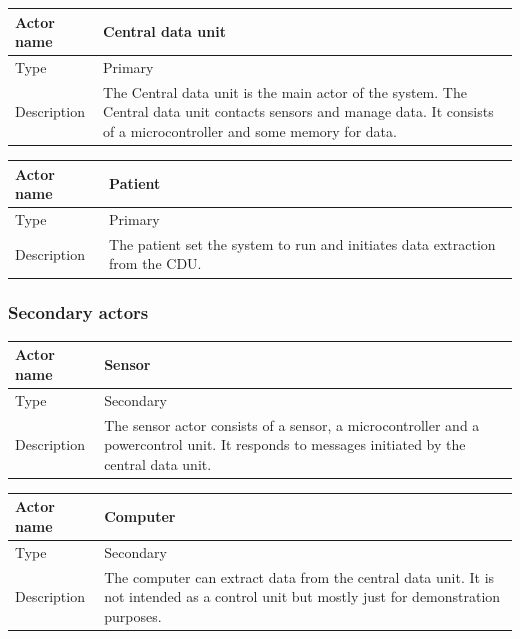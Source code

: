 \begin{table}[H]
	\centering
	\begin{tabular}{|l|p{7cm}|}
	\hline
	Actor name & Central data unit \\ \hline
	Type & Primary \\ \hline
	Description & The Central data unit is the main actor of the system. The Central data unit contacts sensors and manage data. It consists of a microcontroller and some memory for data. \\ \hline
	\end{tabular}
\end{table}

\begin{table}[H]
	\centering
	\begin{tabular}{|l|p{7cm}|}
	\hline
	Actor name & Patient \\ \hline
	Type & Primary \\ \hline
	Description &  The patient set the system to run and initiates data extraction from the CDU.\\ \hline
	\end{tabular}
\end{table}

\subsubsection{Secondary actors}

\begin{table}[H]
	\centering
	\begin{tabular}{|l|p{7cm}|}
	\hline
	Actor name & Sensor \\ \hline
	Type & Secondary \\ \hline
	Description & The sensor actor consists of a sensor, a microcontroller and a powercontrol unit. It responds to messages initiated by the central data unit.\\ \hline
	\end{tabular}
\end{table}

\begin{table}[H]
	\centering
	\begin{tabular}{|l|p{7cm}|}
	\hline
	Actor name & Computer \\ \hline
	Type & Secondary \\ \hline
	Description & The computer can extract data from the central data unit. It is not intended as a control unit but mostly just for demonstration purposes. \\ \hline
	\end{tabular}
\end{table}




